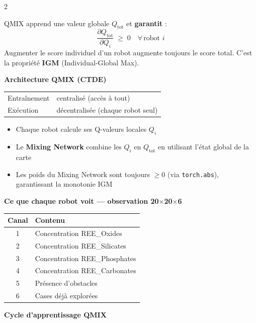 \documentclass[a4paper,landscape]{article}
\begin{document}
\begin{multicols}{2}
\begin{tcolorbox}[colback=colServer!6,colframe=colServer,
    fonttitle=\bfseries\normalsize,title=Partie 1 — QMIX expliqué simplement,
    arc=5pt,boxrule=1.3pt]
QMIX apprend une valeur globale \(Q_{\text{tot}}\) et \textbf{garantit} :
\[
    \frac{\partial Q_{\text{tot}}}{\partial Q_i} \;\geq\; 0
    \quad \forall\, \text{robot } i
\]
Augmenter le score individuel d'un robot augmente toujours le score total.
C'est la propriété \textbf{IGM} (Individual-Global Max).

\medskip
\textbf{Architecture QMIX (CTDE)}

\begin{center}
\small
\begin{tabular}{@{}ll@{}}
\toprule
Entraînement & centralisé (accès à tout) \\
Exécution    & décentralisée (chaque robot seul) \\
\bottomrule
\end{tabular}
\end{center}

\medskip
\begin{itemize}[leftmargin=1.2em,itemsep=2pt]
    \item Chaque robot calcule ses Q-valeurs locales \(Q_i\)
    \item Le \textbf{Mixing Network} combine les \(Q_i\) en \(Q_{\text{tot}}\)
          en utilisant l'état global de la carte
    \item Les poids du Mixing Network sont toujours \(\geq 0\) (via
          \texttt{torch.abs}), garantissant la monotonie IGM
\end{itemize}

\medskip
\textbf{Ce que chaque robot voit — observation 20\(\times\)20\(\times\)6}

\begin{center}
\small
\begin{tabular}{@{}cl@{}}
\toprule
Canal & Contenu \\
\midrule
1 & Concentration REE\_Oxides \\
2 & Concentration REE\_Silicates \\
3 & Concentration REE\_Phosphates \\
4 & Concentration REE\_Carbonates \\
5 & Présence d'obstacles \\
6 & Cases déjà explorées \\
\bottomrule
\end{tabular}
\end{center}

\medskip
\textbf{Cycle d'apprentissage QMIX}


\end{tcolorbox}
\end{multicols}
\end{document}

